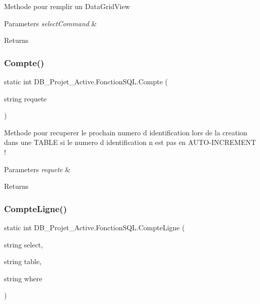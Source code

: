 Methode pour remplir un Data\+Grid\+View 


\begin{DoxyParams}{Parameters}
{\em select\+Command} & \\
\hline
\end{DoxyParams}
\begin{DoxyReturn}{Returns}

\end{DoxyReturn}
\mbox{\label{class_d_b___projet___active_1_1_fonction_s_q_l_ae2bd05ada96dba7e25c282195588c1ff}} 
\subsubsection{\texorpdfstring{Compte()}{Compte()}}
{\footnotesize\ttfamily static int D\+B\+\_\+\+Projet\+\_\+\+Active.\+Fonction\+S\+Q\+L.\+Compte (\begin{DoxyParamCaption}\item[{string}]{requete }\end{DoxyParamCaption})\hspace{0.3cm}{\ttfamily [static]}}



Methode pour recuperer le prochain numero d identification lors de la creation dans une T\+A\+B\+LE si le numero d identification n est pas en A\+U\+T\+O-\/\+I\+N\+C\+R\+E\+M\+E\+NT ! 


\begin{DoxyParams}{Parameters}
{\em requete} & \\
\hline
\end{DoxyParams}
\begin{DoxyReturn}{Returns}

\end{DoxyReturn}
\mbox{\label{class_d_b___projet___active_1_1_fonction_s_q_l_a717706aa5be603169ecc0a6098477cb6}} 
\subsubsection{\texorpdfstring{CompteLigne()}{CompteLigne()}}
{\footnotesize\ttfamily static int D\+B\+\_\+\+Projet\+\_\+\+Active.\+Fonction\+S\+Q\+L.\+Compte\+Ligne (\begin{DoxyParamCaption}\item[{string}]{select,  }\item[{string}]{table,  }\item[{string}]{where }\end{DoxyParamCaption})\hspace{0.3cm}{\ttfamily [static]}}




